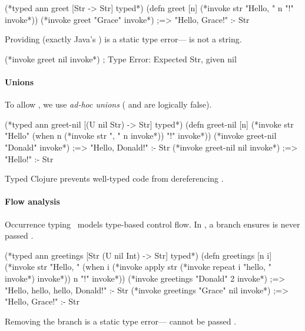 \begin{cljlisting}
(*typed ann  greet [Str -> Str] typed*)
(defn greet [n] (*invoke str "Hello, " n "!" invoke*))
(*invoke greet "Grace" invoke*) ;=> "Hello, Grace!" :- Str
\end{cljlisting}

Providing  (exactly Java's )
is a static type error--- is not a string.

\begin{cljlisting}
(*invoke greet nil invoke*) ; Type Error: Expected Str, given nil
\end{cljlisting}

\paragraph{Unions} To allow , we use \emph{ad-hoc unions} ( and 
are logically false).

\begin{cljlisting}
(*typed ann  greet-nil [(U nil Str) -> Str] typed*)
(defn greet-nil [n] (*invoke str "Hello" (when n (*invoke str ", " n invoke*)) "!" invoke*))
(*invoke greet-nil "Donald" invoke*) ;=> "Hello, Donald!" :- Str 
(*invoke greet-nil nil invoke*)      ;=> "Hello!"         :- Str
\end{cljlisting}
%

Typed Clojure prevents well-typed code from dereferencing .

\paragraph{Flow analysis} Occurrence typing~\cite{TF10}
models type-based control flow.
In , a branch ensures 
is never passed .

\begin{cljlisting}
(*typed ann  greetings [Str (U nil Int) -> Str] typed*)
(defn greetings [n i]
  (*invoke str "Hello, " (when i (*invoke apply str (*invoke repeat i "hello, " invoke*) invoke*)) n "!" invoke*))
(*invoke greetings "Donald" 2 invoke*)  ;=> "Hello, hello, hello, Donald!" :- Str
(*invoke greetings "Grace" nil invoke*) ;=> "Hello, Grace!"                :- Str
\end{cljlisting}

Removing the branch is a static type error--- cannot be passed .

